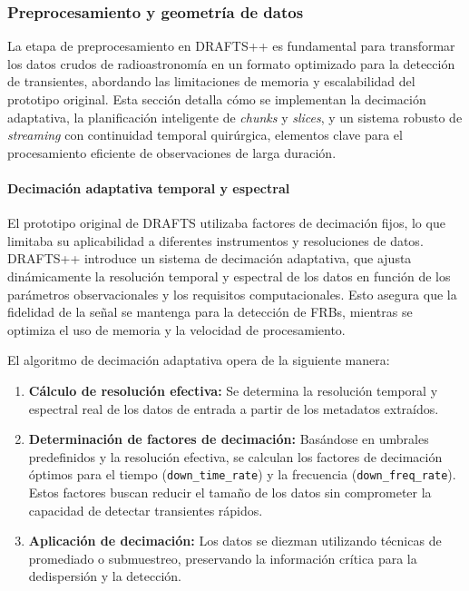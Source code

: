 \subsubsection{Preprocesamiento y geometría de datos}

La etapa de preprocesamiento en DRAFTS++ es fundamental para transformar los datos crudos de radioastronomía en un formato optimizado para la detección de transientes, abordando las limitaciones de memoria y escalabilidad del prototipo original. Esta sección detalla cómo se implementan la decimación adaptativa, la planificación inteligente de \emph{chunks} y \emph{slices}, y un sistema robusto de \emph{streaming} con continuidad temporal quirúrgica, elementos clave para el procesamiento eficiente de observaciones de larga duración.

\paragraph{Decimación adaptativa temporal y espectral}

El prototipo original de DRAFTS utilizaba factores de decimación fijos, lo que limitaba su aplicabilidad a diferentes instrumentos y resoluciones de datos. DRAFTS++ introduce un sistema de decimación adaptativa, que ajusta dinámicamente la resolución temporal y espectral de los datos en función de los parámetros observacionales y los requisitos computacionales. Esto asegura que la fidelidad de la señal se mantenga para la detección de FRBs, mientras se optimiza el uso de memoria y la velocidad de procesamiento.

El algoritmo de decimación adaptativa opera de la siguiente manera:
\begin{enumerate}
    \item \textbf{Cálculo de resolución efectiva:} Se determina la resolución temporal y espectral real de los datos de entrada a partir de los metadatos extraídos.
    \item \textbf{Determinación de factores de decimación:} Basándose en umbrales predefinidos y la resolución efectiva, se calculan los factores de decimación óptimos para el tiempo (\texttt{down\_time\_rate}) y la frecuencia (\texttt{down\_freq\_rate}). Estos factores buscan reducir el tamaño de los datos sin comprometer la capacidad de detectar transientes rápidos.
    \item \textbf{Aplicación de decimación:} Los datos se diezman utilizando técnicas de promediado o submuestreo, preservando la información crítica para la dedispersión y la detección.
\end{enumerate}

